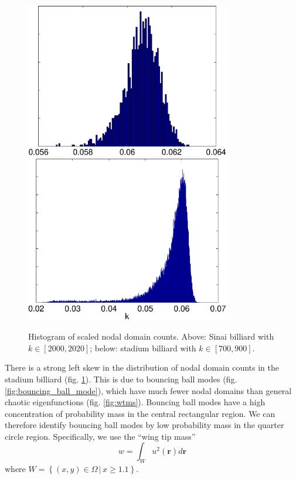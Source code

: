 \documentclass{report}
\newcommand{\rr}[0]{\mathbf{r}}
\begin{document}
\begin{figure}
  \begin{center}
    \includegraphics[width=0.8\textwidth]{figs/results/qugrs_2000_to_2020_count_histogram.eps}
    \linebreak
    \includegraphics[width=0.8\textwidth]{figs/results/qust_700_to_900_count_histogram.eps}
    \caption{Histogram of scaled nodal domain counts. Above: Sinai billiard with $k \in [2000, 2020]$; below: stadium billiard with $k \in [700, 900]$.}
    \label{fig:histograms}
  \end{center}
\end{figure}

There is a strong left skew in the distribution of nodal domain counts in the stadium billiard (fig. \ref{fig:histograms}). This is due to bouncing ball modes (fig. \ref{fig:bouncing_ball_mode}), which have much fewer nodal domains than general chaotic eigenfunctions (fig. \ref{fig:wtms}). Bouncing ball modes have a high concentration of probability mass in the central rectangular region. We can therefore identify bouncing ball modes by low probability mass in the quarter circle region. Specifically, we use the ``wing tip mass''
\[
w = \int_{W} u^{2}(\rr) d\rr
\]
where $W = \left\{ (x,y) \in \Omega \, \vert \, x \ge 1.1 \right\} $.
\end{document}
